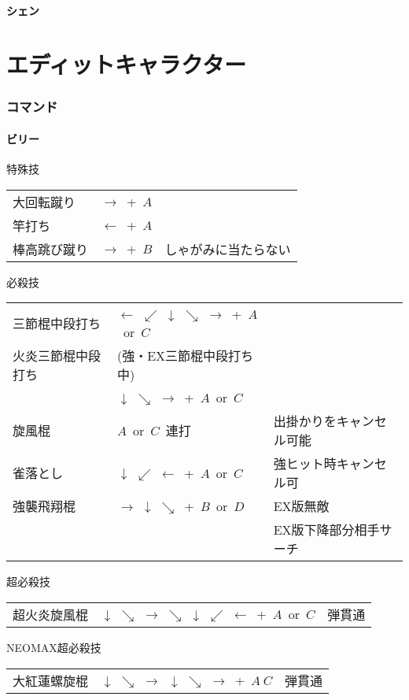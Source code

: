 \documentclass[a4j,11pt]{jarticle}
\def\hado{$\downarrow$ $\searrow$ $\rightarrow$}%
\def\tatsu{$\downarrow$ $\swarrow$ $\leftarrow$}%
\def\syoryu{$\rightarrow$ $\downarrow$ $\searrow$}%
\def\yoga{$\leftarrow$ $\swarrow$ $\downarrow$ $\searrow$ $\rightarrow$}%
\def\ryuko{$\downarrow$ $\searrow$ $\rightarrow$ $\searrow$ $\downarrow$ $\swarrow$ $\leftarrow$}%
\begin{document}
\subsection{シェン}
\newpage
\part{エディットキャラクター}%
\section{コマンド}
\subsection{ビリー}
\begin{itembox}[l]{特殊技}
\begin{tabular}{lll}
大回転蹴り&$\rightarrow$\ +\ $A$&\\%
竿打ち&$\leftarrow$\ +\ $A$&\\%
棒高跳び蹴り&$\rightarrow$\ +\ $B$&しゃがみに当たらない%
\end{tabular}
\end{itembox}
\begin{itembox}[l]{必殺技}
\begin{tabular}{lll}
三節棍中段打ち&\yoga\ +\ $A$\ or\ $C$&\\%
火炎三節棍中段打ち&(強・EX三節棍中段打ち中)&\\
&\hado\ +\ $A$\ or\ $C$&\\
旋風棍&$A$\ or\ $C$\ 連打&出掛かりをキャンセル可能\\%
雀落とし&\tatsu\ +\ $A$\ or\ $C$&強ヒット時キャンセル可\\%
強襲飛翔棍&\syoryu\ +\ $B$\ or\ $D$&EX版無敵\\&&EX版下降部分相手サーチ%
\end{tabular}
\end{itembox}
\begin{itembox}[l]{超必殺技}
\begin{tabular}{lll}
超火炎旋風棍&\ryuko\ +\ $A$\ or\ $C$&弾貫通%
\end{tabular}
\end{itembox}
\begin{itembox}[l]{NEOMAX超必殺技}
\begin{tabular}{lll}
大紅蓮螺旋棍&\hado\ \hado\ +\ $A\ C$&弾貫通%
\end{tabular}
\end{itembox}
\newpage
\end{document}
